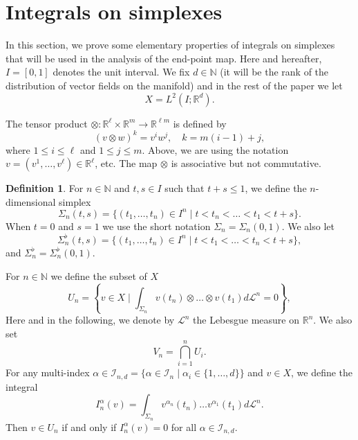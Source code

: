 \documentclass[12pt, reqno]{amsart}
\theoremstyle{plain}
\theoremstyle{definition}
\newtheorem{definition}[theorem]{Definition}
\theoremstyle{remark}
\numberwithin{equation}{section}
\newcommand{\R}{\mathbb{R}}
\newcommand{\N}{\mathbb{N}}
\renewcommand{\L}{\mathcal{L}}
\newcommand{\I}{\mathcal{I}}
\newcommand{\0}{\theta}
\renewcommand{\a}{\alpha}
\newcommand{\1}{{-1}}
\renewcommand{\l}{\ell}
\renewcommand{\=}{\coloneqq}
\renewcommand{\.}{\dots}
\newcommand{\be}{\begin{equation}}
\newcommand{\ee}{\end{equation}}
\begin{document}
 
 
 
 
 
 
 
 
 
 
 
 
 
 
 


\section{Integrals on simplexes}\label{secthree}

In this section, we prove some elementary properties of integrals on simplexes that will be used in the analysis of the end-point map.
Here and hereafter, $I=[0,1]$ denotes the unit interval. We fix $d\in\N$ (it will be the rank of the distribution of vector fields on the manifold) and in the rest of the paper we let 
\[
    X = L^2(I;\R^d).
\]

The tensor product  $\otimes: \R^\l \times \R^m\to \R^{\l m}$ is defined by 
	\[
		(v\otimes w)^k = v^i w^j, \quad   k =m(i-1)+j  ,
	\]
where $ 1\le i\le \l $ and $1\le j\le m$.  Above,  we are using the notation $v= (v^1,\dots, v^\l)\in\R^\l $, etc.
The map $\otimes$ is associative but not commutative.



 

\begin{definition}\label{defi:simplexts}
	For  $n\in \N$ and $t,s \in I$  such that $t+s\le 1$, we  define the $n$-dimensional simplex
\be\label{eq:simplextsf}
	\Sigma_n(t,s)=\big\{ (t_1,\dots,t_n)\in I^n\mid t<t_n<\dots<t_1<t+s \big\}.
\ee
When $t=0$ and $s=1$ we use the short notation $\Sigma_n=\Sigma_n(0,1)$.
We also let  
\be\label{eq:simplexts}
	\Sigma_n^\flat(t,s)=\big\{ (t_1,\dots,t_n)\in I^n\mid t<t_1<\dots<t_n<t+s \big\},
\ee
and   $\Sigma_n^\flat=\Sigma_n^\flat(0,1).$

\end{definition}


 
For   $n\in \N$ we define the   subset of $X $
\be\label{eq:workingspacen}
	U_n =\left\{ v\in X \mid \int_{\Sigma_n}v(t_n)\otimes \dots\otimes v(t_1) d\L^n =0 \right\},
\ee
Here and in the following, we denote by $\L^n$ the Lebesgue measure on $\R^n$. We also set  
\begin{equation} \label{bip}
	V_n= \bigcap_{i=1}^n U_i.
\end{equation}
 For any multi-index $\a\in \I_{n,d} =\big \{\a\in\I_n\mid \a_i \in\{1,\dots,d\}\big\}$ and $v\in X$, we define the integral
 \[
    I_n^\a(v) =\int_{\Sigma_n} v^{\a_n}(t_n) \dots v^{\a_1}(t_1) d\L^n.
 \]
 Then $v\in U_n$ if and only if $I_n^\a(v) =0$ for all $\a\in\I_{n,d}$.
\end{document}
